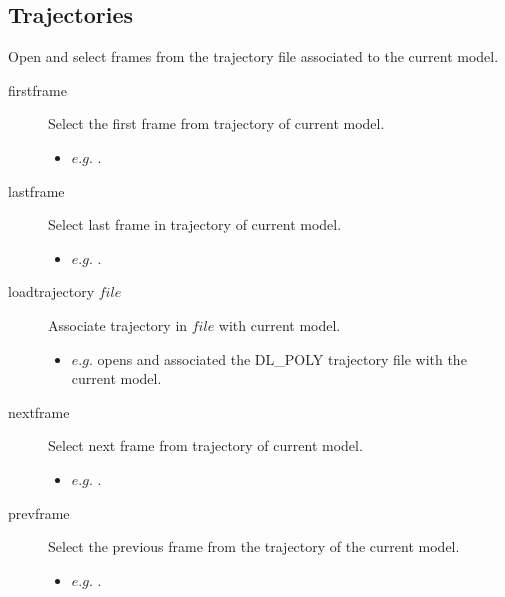\subsection{Trajectories}
Open and select frames from the trajectory file associated to the current model.\\
\begin{description}

	\item[firstframe\its] Select the first frame from trajectory of current model.
	\begin{itemize}
		\item $e.g.$ .
	\end{itemize}

	\item[lastframe\its] Select last frame in trajectory of current model.
	\begin{itemize}
		\item $e.g.$ .
	\end{itemize}

	\item[loadtrajectory $file$\its] Associate trajectory in $file$ with current model.
	\begin{itemize}
		\item $e.g.$  opens and associated the DL\_POLY trajectory file  with the current model.
	\end{itemize}

	\item[nextframe\its] Select next frame from trajectory of current model.
	\begin{itemize}
		\item $e.g.$ .
	\end{itemize}

	\item[prevframe\its] Select the previous frame from the trajectory of the current model.
	\begin{itemize}
		\item $e.g.$ .
	\end{itemize}

\end{description}


